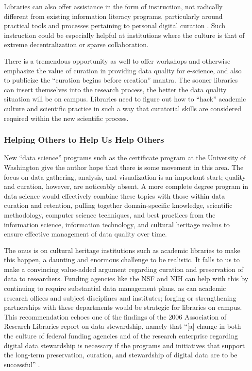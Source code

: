 \documentclass{acm_proc_article-sp}
\begin{document}
Libraries can also offer assistance in the form of instruction, not
radically different from existing information literacy programs,
particularly around practical tools and processes pertaining to
personal digital curation \cite{williams:lifecycle}. Such instruction
could be especially helpful at institutions where the culture is that
of extreme decentralization or sparse collaboration.

There is a tremendous opportunity as well to offer workshops and
otherwise emphasize the value of curation in providing data quality
for e-science, and also to publicize the ``curation begins before
creation'' mantra. The sooner libraries can insert themselves into the
research process, the better the data quality situation will be on
campus. Libraries need to figure out how to ``hack'' academic culture
and scientific practice in such a way that curatorial skills are
considered required within the new scientific process.

\subsubsection{Helping Others to Help Us Help Others}

New ``data science'' programs such as the certificate program at the
University of Washington \cite{uw:datascience} give the author hope
that there is some movement in this area. The focus on data gathering,
analysis, and visualization is an important start; quality and
curation, however, are noticeably absent. A more complete degree
program in data science would effectively combine these topics with
those within data curation and retention, pulling together
domain-specific knowledge, scientific methodology, computer science
techniques, and best practices from the information science,
information technology, and cultural heritage realms to ensure
effective management of data quality over time.

The onus is on cultural heritage institutions such as academic
libraries to make this happen, a daunting and enormous challenge to be
realistic. It falls to us to make a convincing value-added argument
regarding curation and preservation of data to researchers. Funding
agencies like the NSF and NIH can help with this by continuing to
require substantial data management plans, as can academic research
offices and subject disciplines and institutes; forging or
strengthening partnerships with these departments would be strategic
for libraries on campus. This recommendation echoes one of the
findings of the 2006 Association of Research Libraries report on data
stewardship, namely that ``[a] change in both the culture of federal
funding agencies and of the research enterprise regarding digital data
stewardship is necessary if the programs and initiatives that support
the long-term preservation, curation, and stewardship of digital data
are to be successful'' \cite{arl:stewardship}.
\end{document}

